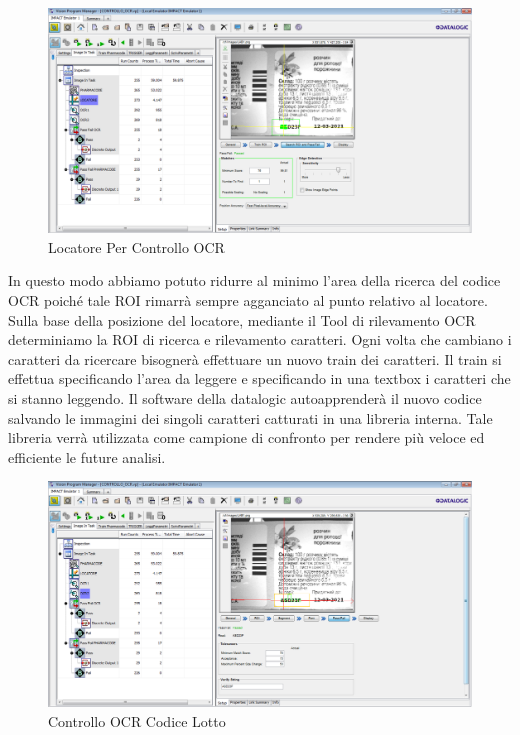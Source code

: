 \documentclass[12pt, a4paper, oneside]{book}
\begin{document}
\begin{itemize}
		\begin{figure}[H]
		\centering
		\includegraphics[width=13cm]{Immagini/VIS9}
		\caption{Locatore Per Controllo OCR}
		\label{vis9}
	\end{figure}

In questo modo abbiamo potuto ridurre al minimo l'area della ricerca del codice OCR poiché tale ROI rimarrà sempre agganciato al punto relativo al locatore.
Sulla base della posizione del locatore, mediante il Tool di rilevamento OCR determiniamo la ROI di ricerca e rilevamento caratteri. Ogni volta che cambiano i caratteri da ricercare bisognerà effettuare un nuovo train dei caratteri. Il train si effettua specificando l'area da leggere e specificando in una textbox i caratteri che si stanno leggendo. Il software della datalogic autoapprenderà il nuovo codice salvando le immagini dei singoli caratteri catturati in una libreria interna. Tale libreria verrà utilizzata come campione di confronto per rendere più veloce ed efficiente le future analisi. 

		\begin{figure}[H]
	\centering
	\includegraphics[width=13cm]{Immagini/VIS10}
	\caption{Controllo OCR Codice Lotto}
	\label{vis10}
\end{figure}


\end{itemize}
\end{document}
